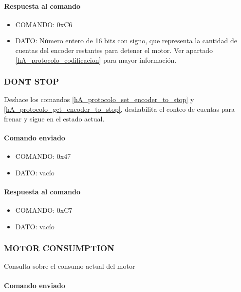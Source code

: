 \paragraph*{Respuesta al comando}

\begin{itemize}
	\item{COMANDO:} 0xC6
	\item{DATO:} N\'umero entero de 16 bits con signo, que representa la cantidad de cuentas del encoder restantes para detener el motor.
		Ver apartado \ref{hA_protocolo_codificacion} para mayor informaci\'on.
\end{itemize}

\subsubsection{DONT STOP}
\label{hA_protocolo_dont_stop}

Deshace los comandos \ref{hA_protocolo_set_encoder_to_stop} y \ref{hA_protocolo_get_encoder_to_stop}, deshabilita el conteo de cuentas para frenar y sigue en el estado actual.

\paragraph*{Comando enviado}

\begin{itemize}
	\item{COMANDO:} 0x47
	\item{DATO:} vac\'io
\end{itemize}

\paragraph*{Respuesta al comando}

\begin{itemize}
	\item{COMANDO:} 0xC7
	\item{DATO:} vac\'io
\end{itemize}

\subsubsection{MOTOR CONSUMPTION}
\label{hA_protocolo_motor_consumption}

Consulta sobre el consumo actual del motor

\paragraph*{Comando enviado}

